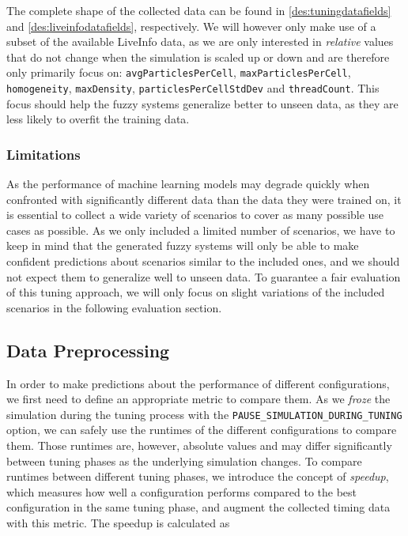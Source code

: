 The complete shape of the collected data can be found in \autoref{des:tuningdatafields} and \autoref{des:liveinfodatafields}, respectively. We will however only make use of a subset of the available LiveInfo data, as we are only interested in \emph{relative} values that do not change when the simulation is scaled up or down and are therefore only primarily focus on: \texttt{avgParticlesPerCell}, \texttt{maxParticlesPerCell}, \texttt{homogeneity}, \texttt{maxDensity}, \texttt{particlesPerCellStdDev} and \texttt{threadCount}. This focus should help the fuzzy systems generalize better to unseen data, as they are less likely to overfit the training data.


\subsubsection{Limitations}

As the performance of machine learning models may degrade quickly when confronted with significantly different data than the data they were trained on, it is essential to collect a wide variety of scenarios to cover as many possible use cases as possible. As we only included a limited number of scenarios, we have to keep in mind that the generated fuzzy systems will only be able to make confident predictions about scenarios similar to the included ones, and we should not expect them to generalize well to unseen data.
To guarantee a fair evaluation of this tuning approach, we will only focus on slight variations of the included scenarios in the following evaluation section.

\subsection{Data Preprocessing}

In order to make predictions about the performance of different configurations, we first need to define an appropriate metric to compare them. As we \emph{froze} the simulation during the tuning process with the \texttt{PAUSE\_SIMULATION\_DURING\_TUNING} option, we can safely use the runtimes of the different configurations to compare them. Those runtimes are, however, absolute values and may differ significantly between tuning phases as the underlying simulation changes. To compare runtimes between different tuning phases, we introduce the concept of \emph{speedup}, which measures how well a configuration performs compared to the best configuration in the same tuning phase, and augment the collected timing data with this metric. The speedup is calculated as


